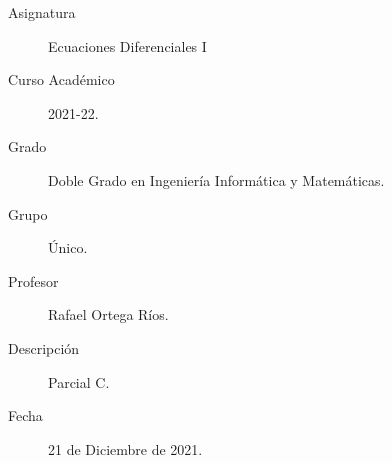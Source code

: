 \documentclass[12pt]{article}
\begin{document}

    
    

    \begin{description}
        \item[Asignatura] Ecuaciones Diferenciales I
        \item[Curso Académico] 2021-22.
        \item[Grado] Doble Grado en Ingeniería Informática y Matemáticas.
        \item[Grupo] Único.
        \item[Profesor] Rafael Ortega Ríos.
        \item[Descripción] Parcial C.
        \item[Fecha] 21 de Diciembre de 2021.
    \end{description}
    \newpage
\end{document}
